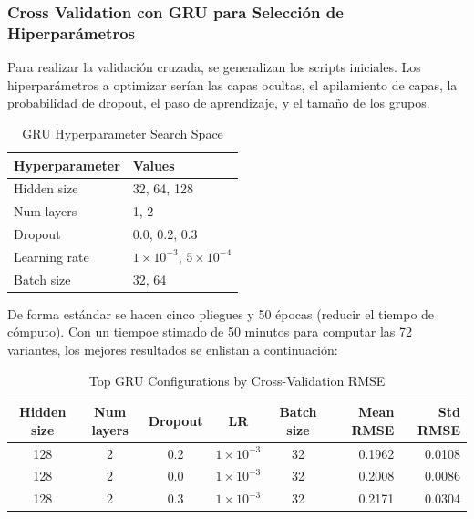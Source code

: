 \documentclass{article}
\begin{document}
\subsubsection{Cross Validation con GRU para Selección de Hiperparámetros}
Para realizar la validación cruzada, se generalizan los scripts iniciales. Los hiperparámetros a optimizar serían las capas ocultas, el apilamiento de capas, la probabilidad de dropout, el paso de aprendizaje, y el tamaño de los grupos.

\begin{table}[h]
    \centering
    \caption{GRU Hyperparameter Search Space}
    \label{tab:gru_hyperparam}
    \begin{tabular}{ll}
    \hline
    \textbf{Hyperparameter} & \textbf{Values} \\
    \hline
    Hidden size   & 32, 64, 128 \\
    Num layers    & 1, 2 \\
    Dropout       & 0.0, 0.2, 0.3 \\
    Learning rate & $1\times10^{-3}$, $5\times10^{-4}$ \\
    Batch size    & 32, 64 \\
    \hline
    \end{tabular}
    \end{table}
De forma estándar se hacen cinco pliegues y 50 épocas (reducir el tiempo de cómputo). Con un tiempoe stimado de 50 minutos para computar las 72 variantes, los mejores resultados se enlistan a continuación:

\begin{table}[h]
    \centering
    \caption{Top GRU Configurations by Cross-Validation RMSE}
    \label{tab:gru_cv_results}
    \begin{tabular}{cccccrr}
    \hline
    \textbf{Hidden size} & \textbf{Num layers} & \textbf{Dropout} & \textbf{LR} & \textbf{Batch size} & \textbf{Mean RMSE} & \textbf{Std RMSE} \\
    \hline
    128 & 2 & 0.2 & $1\times10^{-3}$ & 32 & 0.1962 & 0.0108 \\
    128 & 2 & 0.0 & $1\times10^{-3}$ & 32 & 0.2008 & 0.0086 \\
    128 & 2 & 0.3 & $1\times10^{-3}$ & 32 & 0.2171 & 0.0304 \\
    \hline
    \end{tabular}
    \end{table}
\end{document}
